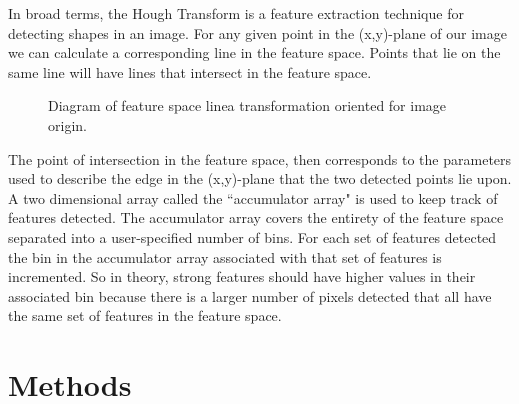 \documentclass[12pt]{article}\usepackage[]{graphicx}\usepackage[]{color}
\theoremstyle{nonumberplain}
\begin{document}
In broad terms, the Hough Transform is a feature extraction technique for detecting shapes in an image. For any given point in the (x,y)-plane of our image we can calculate a corresponding line in the feature space. Points that lie on the same line will have lines that intersect in the feature space. 
\begin{figure}[!ht]
\begin{subfigure}{.5\textwidth}
\centering
{}
\label{fig:tikz1}
\end{subfigure}
\begin{subfigure}{.5\textwidth}
\centering
{}
\label{fig:tikz2}
\end{subfigure}
\caption{Diagram of feature space linea transformation oriented for image origin.}
\label{fig:parametrization}
\end{figure}


The point of intersection in the feature space, then corresponds to the parameters used to describe the edge in the (x,y)-plane that the two detected points lie upon. A two dimensional array called the ``accumulator array" is used to keep track of features detected.  The accumulator array covers the entirety of the feature space separated into a user-specified number of bins. For each set of features detected the bin in the accumulator array associated with that set of features is incremented. So in theory, strong features should have higher values in their associated bin because there is a larger number of pixels detected that all have the same set of features in the feature space. 


\section{Methods}
\end{document}
